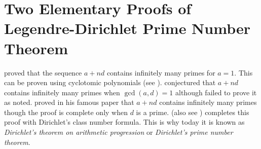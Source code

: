 \documentclass[elemannt.tex]{subfile}
\begin{document}
	\chapter{Two Elementary Proofs of Legendre-Dirichlet Prime Number Theorem}\label{ch:legendre}
	\textcite[pp. 241]{euler_1783} proved that the sequence ${a+nd}$ contains infinitely many primes for $a=1$. This can be proven using cyclotomic polynomials (see \textcite[$\S1.4$, Theorem 1.47]{billal_riasat_2021}). \textcite[pp. 404]{legendre_1798} conjectured that ${a+nd}$ contains infinitely many primes when $\gcd(a,d)=1$ although failed to prove it as \textcite[$\S29$, pp. $505-508$]{gauss_1801} noted. \textcite{dirichlet_1837} proved in his famous paper that $a+nd$ contains infinitely many primes though the proof is complete only when $d$ is a prime. \textcite{dirichlet_1839} (also see \textcite{dirichlet_1897_28}) completes this proof with Dirichlet's class number formula. This is why today it is known as \textit{Dirichlet's theorem on arithmetic progression} or \textit{Dirichlet's prime number theorem}.
\end{document}

